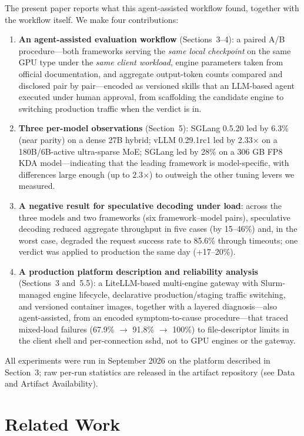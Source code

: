 \documentclass[11pt]{article}
\begin{document}
The present paper reports what this agent-assisted workflow found, together with the workflow itself. We make four contributions:

\begin{enumerate}
\item \textbf{An agent-assisted evaluation workflow} (Sections~3--4): a paired A/B procedure---both frameworks serving the \emph{same local checkpoint} on the same GPU type under the \emph{same client workload}, engine parameters taken from official documentation, and aggregate output-token counts compared and disclosed pair by pair---encoded as versioned skills that an LLM-based agent executed under human approval, from scaffolding the candidate engine to switching production traffic when the verdict is in.
\item \textbf{Three per-model observations} (Section~5): SGLang 0.5.20 led by 6.3\% (near parity) on a dense 27B hybrid; vLLM 0.29.1rc1 led by 2.33$\times$ on a 180B/6B-active ultra-sparse MoE; SGLang led by 28\% on a 306 GB FP8 KDA model---indicating that the leading framework is model-specific, with differences large enough (up to 2.3$\times$) to outweigh the other tuning levers we measured.
\item \textbf{A negative result for speculative decoding under load}: across the three models and two frameworks (six framework--model pairs), speculative decoding reduced aggregate throughput in five cases (by 15--46\%) and, in the worst case, degraded the request success rate to 85.6\% through timeouts; one verdict was applied to production the same day (+17--20\%).
\item \textbf{A production platform description and reliability analysis} (Sections~3 and~5.5): a LiteLLM-based multi-engine gateway with Slurm-managed engine lifecycle, declarative production/staging traffic switching, and versioned container images, together with a layered diagnosis---also agent-assisted, from an encoded symptom-to-cause procedure---that traced mixed-load failures (67.9\% $\rightarrow$ 91.8\% $\rightarrow$ 100\%) to file-descriptor limits in the client shell and per-connection sshd, not to GPU engines or the gateway.
\end{enumerate}

All experiments were run in September 2026 on the platform described in Section~3; raw per-run statistics are released in the artifact repository (see Data and Artifact Availability).

\section{Related Work}
\end{document}
